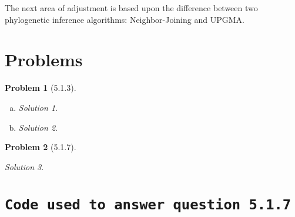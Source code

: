 \documentclass[11pt]{article}
\theoremstyle{definition}\newtheorem*{problem}{Problem}
\theoremstyle{remark}\newtheorem{claim}{Claim}
\theoremstyle{remark}\newtheorem*{sol}{Solution}
\begin{document}
\par The next area of adjustment is based upon the difference between two phylogenetic inference algorithms: Neighbor-Joining and UPGMA. 


\section{Problems}

\begin{problem}[5.1.3] 
\end{problem}
\begin{enumerate}[a.]

\item 
\begin{sol} 
\end{sol}

\item 
\begin{sol}
\end{sol}


\end{enumerate}

\begin{problem}[5.1.7] 
\end{problem}

\begin{sol}
\end{sol}


\section{\texttt{Code used to answer question 5.1.7}}
\end{document}
